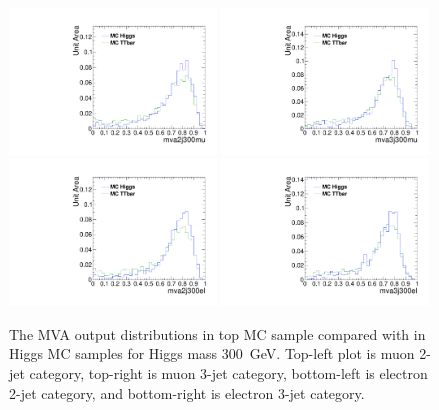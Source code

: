 \begin{figure}[!t]
  \centering
  \includegraphics[width=0.49\textwidth]{figs/cl-mva2j300mu-mvaTopvsHiggs.pdf}
  \includegraphics[width=0.49\textwidth]{figs/cl-mva3j300mu-mvaTopvsHiggs.pdf}
  \includegraphics[width=0.49\textwidth]{figs/cl-mva2j300el-mvaTopvsHiggs.pdf}
  \includegraphics[width=0.49\textwidth]{figs/cl-mva3j300el-mvaTopvsHiggs.pdf}
  \caption{\label{fig:mva:sigvsttbar-mva2j300}The MVA output
    distributions in top MC sample compared with in Higgs MC
    samples for Higgs mass 300~GeV. Top-left plot is muon 2-jet category,
    top-right is muon 3-jet category, bottom-left is electron 2-jet
    category, and bottom-right is electron 3-jet category. }
\end{figure}

